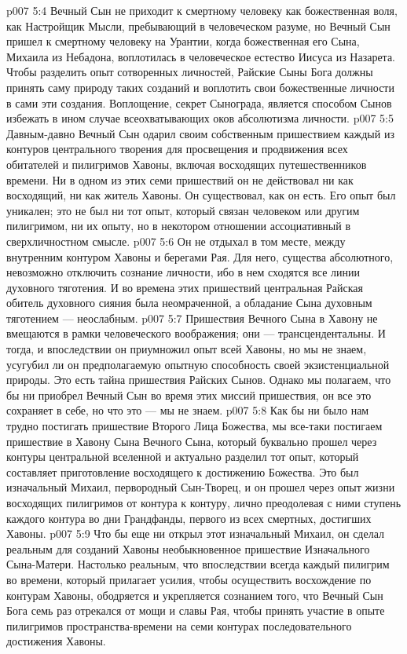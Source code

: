 \vs p007 5:4 Вечный Сын не приходит к смертному человеку как божественная воля, как Настройщик Мысли, пребывающий в человеческом разуме, но Вечный Сын пришел к смертному человеку на Урантии, когда божественная  его Сына, Михаила из Небадона, воплотилась в человеческое естество Иисуса из Назарета. Чтобы разделить опыт сотворенных личностей, Райские Сыны Бога должны принять саму природу таких созданий и воплотить свои божественные личности в сами эти создания. Воплощение, секрет Сынограда, является способом Сынов избежать в ином случае всеохватывающих оков абсолютизма личности.
\vs p007 5:5 \pc Давным\hyp{}давно Вечный Сын одарил своим собственным пришествием каждый из контуров центрального творения для просвещения и продвижения всех обитателей и пилигримов Хавоны, включая восходящих путешественников времени. Ни в одном из этих семи пришествий он не действовал ни как восходящий, ни как житель Хавоны. Он существовал, как он есть. Его опыт был уникален; это не был ни тот опыт, который связан  человеком или другим пилигримом, ни  их опыту, но в некотором отношении ассоциативный в сверхличностном смысле.
\vs p007 5:6 Он не отдыхал в том месте, между внутренним контуром Хавоны и берегами Рая. Для него, существа абсолютного, невозможно отключить сознание личности, ибо в нем сходятся все линии духовного тяготения. И во времена этих пришествий центральная Райская обитель духовного сияния была неомраченной, а обладание Сына духовным тяготением --- неослабным.
\vs p007 5:7 \pc Пришествия Вечного Сына в Хавону не вмещаются в рамки человеческого воображения; они --- трансцендентальны. И тогда, и впоследствии он приумножил опыт всей Хавоны, но мы не знаем, усугубил ли он предполагаемую опытную способность своей экзистенциальной природы. Это есть тайна пришествия Райских Сынов. Однако мы полагаем, что бы ни приобрел Вечный Сын во время этих миссий пришествия, он все это сохраняет в себе, но что это --- мы не знаем.
\vs p007 5:8 \pc Как бы ни было нам трудно постигать пришествие Второго Лица Божества, мы все\hyp{}таки постигаем пришествие в Хавону Сына Вечного Сына, который буквально прошел через контуры центральной вселенной и актуально разделил тот опыт, который составляет приготовление восходящего к достижению Божества. Это был изначальный Михаил, первородный Сын\hyp{}Творец, и он прошел через опыт жизни восходящих пилигримов от контура к контуру, лично преодолевая с ними ступень каждого контура во дни Грандфанды, первого из всех смертных, достигших Хавоны.
\vs p007 5:9 Что бы еще ни открыл этот изначальный Михаил, он сделал реальным для созданий Хавоны необыкновенное пришествие Изначального Сына\hyp{}Матери. Настолько реальным, что впоследствии всегда каждый пилигрим во времени, который прилагает усилия, чтобы осуществить восхождение по контурам Хавоны, ободряется и укрепляется сознанием того, что Вечный Сын Бога семь раз отрекался от мощи и славы Рая, чтобы принять участие в опыте пилигримов пространства\hyp{}времени на семи контурах последовательного достижения Хавоны.

